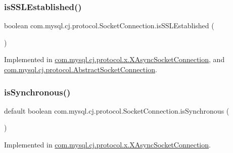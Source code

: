 \subsubsection{\texorpdfstring{is\+S\+S\+L\+Established()}{isSSLEstablished()}}
{\footnotesize\ttfamily boolean com.\+mysql.\+cj.\+protocol.\+Socket\+Connection.\+is\+S\+S\+L\+Established (\begin{DoxyParamCaption}{ }\end{DoxyParamCaption})}



Implemented in \mbox{\hyperlink{classcom_1_1mysql_1_1cj_1_1protocol_1_1x_1_1_x_async_socket_connection_a312eb39f55bfb31c60beab6bb645f8c8}{com.\+mysql.\+cj.\+protocol.\+x.\+X\+Async\+Socket\+Connection}}, and \mbox{\hyperlink{classcom_1_1mysql_1_1cj_1_1protocol_1_1_abstract_socket_connection_ab427edda7170bd3a5a405e5d50bfd50d}{com.\+mysql.\+cj.\+protocol.\+Abstract\+Socket\+Connection}}.

\mbox{\label{interfacecom_1_1mysql_1_1cj_1_1protocol_1_1_socket_connection_a89c2521893554b7052f9e92cdd73c527}} 
\subsubsection{\texorpdfstring{is\+Synchronous()}{isSynchronous()}}
{\footnotesize\ttfamily default boolean com.\+mysql.\+cj.\+protocol.\+Socket\+Connection.\+is\+Synchronous (\begin{DoxyParamCaption}{ }\end{DoxyParamCaption})}



Implemented in \mbox{\hyperlink{classcom_1_1mysql_1_1cj_1_1protocol_1_1x_1_1_x_async_socket_connection_a0e10073e77bdd319bbf9346280c1dad7}{com.\+mysql.\+cj.\+protocol.\+x.\+X\+Async\+Socket\+Connection}}.

\mbox{\label{interfacecom_1_1mysql_1_1cj_1_1protocol_1_1_socket_connection_a15064c0de5e729be5f27a42aee58fdd5}} 
